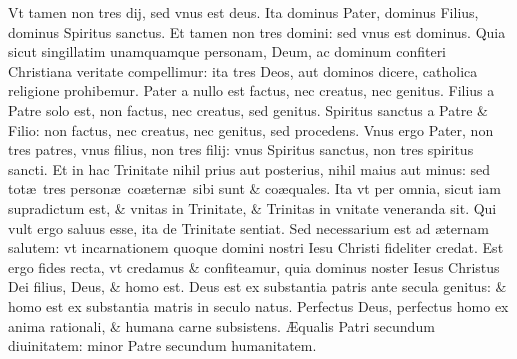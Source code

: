 \documentclass[a5paper,10pt]{book}
\def\ae{æ}
\def\AE{Æ}
\begin{document}
\begin{multicols*}{2}
\newline \color{red} V\color{black}t tamen non tres dij, sed vnus est deus.
\newline \color{red} I\color{black}ta dominus Pater, dominus Filius, dominus Spiritus sanctus.
\newline \color{red} E\color{black}t tamen non tres domini: sed vnus est dominus.
\newline \color{red} Q\color{black}uia sicut singillatim unamquamque personam, Deum, ac dominum confiteri Christiana veritate compellimur: ita tres Deos, aut dominos dicere, catholica religione prohibemur.%
\newline \color{red} P\color{black}ater a nullo est factus, nec creatus, nec genitus.
\newline \color{red} F\color{black}ilius a Patre solo est, non factus, nec creatus, sed genitus.
\newline \color{red} S\color{black}piritus sanctus a Patre \& Filio: non factus, nec creatus, nec genitus, sed procedens.
\newline \color{red} V\color{black}nus ergo Pater, non tres patres, vnus filius, non tres filij: vnus Spiritus sanctus, non tres spiritus sancti.
\newline \color{red} E\color{black}t in hac Trinitate nihil prius aut posterius, nihil maius aut minus: sed tot\ae \ tres person\ae \ co\ae tern\ae \ sibi sunt \& co\ae quales.
\newline \color{red} I\color{black}ta vt per omnia, sicut iam supradictum est, \& vnitas in Trinitate, \& Trinitas in vnitate veneranda sit.
\newline \color{red} Q\color{black}ui vult ergo saluus esse, ita de Trinitate sentiat.
\newline \color{red} S\color{black}ed necessarium est ad \ae ternam salutem: vt incarnationem quoque domini nostri Iesu Christi fideliter credat.
\newline \color{red} E\color{black}st ergo fides recta, vt credamus \& confiteamur, quia dominus noster Iesus Christus Dei filius, Deus, \& homo est.
\newline \color{red} D\color{black}eus est ex substantia patris ante secula genitus: \& homo est ex substantia matris in seculo natus.
\newline \color{red} P\color{black}erfectus Deus, perfectus homo ex anima rationali, \& humana carne subsistens.
\newline \color{red} \AE \color{black}qualis Patri secundum diuinitatem: minor Patre secundum humanitatem.

\end{multicols*}
\end{document}
